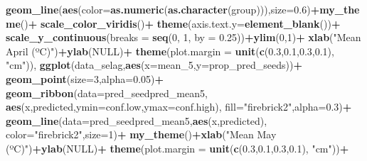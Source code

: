 \documentclass[
]{article}
\newenvironment{Shaded}{\begin{snugshade}}{\end{snugshade}}
\newcommand{\DataTypeTok}[1]{\textcolor[rgb]{0.13,0.29,0.53}{#1}}
\newcommand{\DecValTok}[1]{\textcolor[rgb]{0.00,0.00,0.81}{#1}}
\newcommand{\FloatTok}[1]{\textcolor[rgb]{0.00,0.00,0.81}{#1}}
\newcommand{\KeywordTok}[1]{\textcolor[rgb]{0.13,0.29,0.53}{\textbf{#1}}}
\newcommand{\NormalTok}[1]{#1}
\newcommand{\OperatorTok}[1]{\textcolor[rgb]{0.81,0.36,0.00}{\textbf{#1}}}
\newcommand{\OtherTok}[1]{\textcolor[rgb]{0.56,0.35,0.01}{#1}}
\newcommand{\StringTok}[1]{\textcolor[rgb]{0.31,0.60,0.02}{#1}}
\begin{document}
\begin{Shaded}
\begin{Highlighting}[]
\StringTok{    }\KeywordTok{geom\_line}\NormalTok{(}\KeywordTok{aes}\NormalTok{(}\DataTypeTok{color=}\KeywordTok{as.numeric}\NormalTok{(}\KeywordTok{as.character}\NormalTok{(group))),}\DataTypeTok{size=}\FloatTok{0.6}\NormalTok{)}\OperatorTok{+}\KeywordTok{my\_theme}\NormalTok{()}\OperatorTok{+}
\StringTok{    }\KeywordTok{scale\_color\_viridis}\NormalTok{()}\OperatorTok{+}
\StringTok{    }\KeywordTok{theme}\NormalTok{(}\DataTypeTok{axis.text.y=}\KeywordTok{element\_blank}\NormalTok{())}\OperatorTok{+}
\StringTok{    }\KeywordTok{scale\_y\_continuous}\NormalTok{(}\DataTypeTok{breaks =} \KeywordTok{seq}\NormalTok{(}\DecValTok{0}\NormalTok{, }\DecValTok{1}\NormalTok{, }\DataTypeTok{by =} \FloatTok{0.25}\NormalTok{))}\OperatorTok{+}\KeywordTok{ylim}\NormalTok{(}\DecValTok{0}\NormalTok{,}\DecValTok{1}\NormalTok{)}\OperatorTok{+}
\StringTok{    }\KeywordTok{xlab}\NormalTok{(}\StringTok{"Mean April (ºC)"}\NormalTok{)}\OperatorTok{+}\KeywordTok{ylab}\NormalTok{(}\OtherTok{NULL}\NormalTok{)}\OperatorTok{+}
\StringTok{    }\KeywordTok{theme}\NormalTok{(}\DataTypeTok{plot.margin =} \KeywordTok{unit}\NormalTok{(}\KeywordTok{c}\NormalTok{(}\FloatTok{0.3}\NormalTok{,}\FloatTok{0.1}\NormalTok{,}\FloatTok{0.3}\NormalTok{,}\FloatTok{0.1}\NormalTok{), }\StringTok{"cm"}\NormalTok{)),}
  \KeywordTok{ggplot}\NormalTok{(data\_selag,}\KeywordTok{aes}\NormalTok{(}\DataTypeTok{x=}\NormalTok{mean\_}\DecValTok{5}\NormalTok{,}\DataTypeTok{y=}\NormalTok{prop\_pred\_seeds))}\OperatorTok{+}
\StringTok{    }\KeywordTok{geom\_point}\NormalTok{(}\DataTypeTok{size=}\DecValTok{3}\NormalTok{,}\DataTypeTok{alpha=}\FloatTok{0.05}\NormalTok{)}\OperatorTok{+}
\StringTok{    }\KeywordTok{geom\_ribbon}\NormalTok{(}\DataTypeTok{data=}\NormalTok{pred\_seedpred\_mean5,}
                \KeywordTok{aes}\NormalTok{(x,predicted,}\DataTypeTok{ymin=}\NormalTok{conf.low,}\DataTypeTok{ymax=}\NormalTok{conf.high),}
                \DataTypeTok{fill=}\StringTok{"firebrick2"}\NormalTok{,}\DataTypeTok{alpha=}\FloatTok{0.3}\NormalTok{)}\OperatorTok{+}
\StringTok{    }\KeywordTok{geom\_line}\NormalTok{(}\DataTypeTok{data=}\NormalTok{pred\_seedpred\_mean5,}\KeywordTok{aes}\NormalTok{(x,predicted),}
              \DataTypeTok{color=}\StringTok{"firebrick2"}\NormalTok{,}\DataTypeTok{size=}\DecValTok{1}\NormalTok{)}\OperatorTok{+}
\StringTok{    }\KeywordTok{my\_theme}\NormalTok{()}\OperatorTok{+}\KeywordTok{xlab}\NormalTok{(}\StringTok{"Mean May (ºC)"}\NormalTok{)}\OperatorTok{+}\KeywordTok{ylab}\NormalTok{(}\OtherTok{NULL}\NormalTok{)}\OperatorTok{+}
\StringTok{    }\KeywordTok{theme}\NormalTok{(}\DataTypeTok{plot.margin =} \KeywordTok{unit}\NormalTok{(}\KeywordTok{c}\NormalTok{(}\FloatTok{0.3}\NormalTok{,}\FloatTok{0.1}\NormalTok{,}\FloatTok{0.3}\NormalTok{,}\FloatTok{0.1}\NormalTok{), }\StringTok{"cm"}\NormalTok{))}\OperatorTok{+}

\end{Highlighting}
\end{Shaded}
\end{document}
